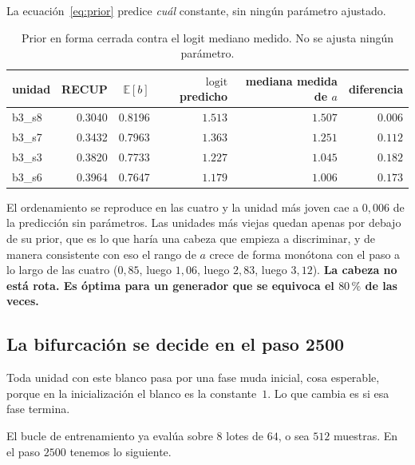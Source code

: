 \documentclass[11pt,a4paper]{article}
\begin{document}
La ecuación~\eqref{eq:prior} predice \emph{cuál} constante, sin ningún parámetro ajustado.

\begin{table}[h]
\centering
\caption{Prior en forma cerrada contra el logit mediano medido. No se ajusta ningún parámetro.}
\begin{tabular}{lrrrrr}
\toprule
unidad & RECUP & $\mathbb{E}[b]$ & $\mathrm{logit}$ predicho & mediana medida de $a$ & diferencia \\
\midrule
b3\_s8 & 0.3040 & 0.8196 & $1.513$ & $1.507$ & $\mathbf{0.006}$ \\
b3\_s7 & 0.3432 & 0.7963 & $1.363$ & $1.251$ & $0.112$ \\
b3\_s3 & 0.3820 & 0.7733 & $1.227$ & $1.045$ & $0.182$ \\
b3\_s6 & 0.3964 & 0.7647 & $1.179$ & $1.006$ & $0.173$ \\
\bottomrule
\end{tabular}
\label{tab:prior}
\end{table}

El ordenamiento se reproduce en las cuatro y la unidad más joven cae a $0{,}006$ de la predicción sin
parámetros. Las unidades más viejas quedan apenas por debajo de su prior, que es lo que haría una
cabeza que empieza a discriminar, y de manera consistente con eso el rango de $a$ crece de forma
monótona con el paso a lo largo de las cuatro ($0{,}85$, luego $1{,}06$, luego $2{,}83$, luego
$3{,}12$). \textbf{La cabeza no está rota. Es óptima para un generador que se equivoca el $80\,\%$ de
las veces.}

\subsection{La bifurcación se decide en el paso 2500}
\label{sec:bifurcacion}

Toda unidad con este blanco pasa por una fase muda inicial, cosa esperable, porque en la
inicialización el blanco es la constante~$1$. Lo que cambia es si esa fase termina.

El bucle de entrenamiento ya evalúa sobre $8$ lotes de $64$, o sea $512$ muestras. En el paso $2500$
tenemos lo siguiente.
\end{document}
